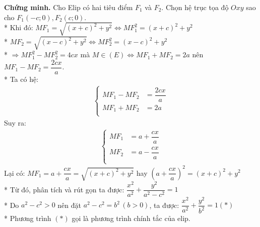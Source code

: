 \textbf{Chứng minh.}
Cho Elip có hai tiêu điểm $F_{1}$ và $F_{2}$. Chọn hệ trục tọa độ $Oxy$ sao cho $F_{1}(-c;0), F_{2}(c;0)$.\\*
Khi đó:
$MF_{1}=\sqrt{(x+c)^{2}+y^{2}}\Leftrightarrow MF_{1}^{2}=(x+c)^{2}+y^{2}$\\*
$MF_{2}=\sqrt{(x-c)^{2}+y^{2}}\Leftrightarrow MF_{2}^{2}=(x-c)^{2}+y^{2}$\\*
$\Rightarrow MF_{1}^{2}-MF_{2}^{2}=4cx$ mà $M\in (E) \Leftrightarrow MF_{1}+MF_{2}=2a$ nên $MF_{1}-MF_{2}=\dfrac{2cx}{a}$.\\*
Ta có hệ:
\begin{align}
    \begin{cases}
       MF_{1}-MF_{2} &=\dfrac{2cx}{a}\\
        MF_{1}+MF_{2} &=2a \\
    \end{cases}
\end{align}
Suy ra:
  \begin{align}
    \begin{cases}
       MF_{1} &=a+\dfrac{cx}{a}\\
       MF_{2} &=a-\dfrac{cx}{a} \\
    \end{cases}
\end{align}
Lại có: $MF_{1}=a+\dfrac{cx}{a}=\sqrt{(x+c)^{2}+y^{2}}$ hay $\left(a+\dfrac{cx}{a}\right)^{2}=(x+c)^{2}+y^{2}$\\*
Từ đó, phân tích và rút gọn ta được: $\dfrac{x^{2}}{a^2}+\dfrac{y^{2}}{a^{2}-c^{2}}=1$\\*
Do $a^{2}-c^{2}>0$ nên đặt $a^{2}-c^{2}=b^{2} \,(b>0)$, ta được:  $\boxed{\dfrac{x^{2}}{a^{2}}+\dfrac{y^{2}}{b^{2}}=1
   (*)}$\\*
Phương trình $(*)$ gọi là phương trình chính tắc của elip.
